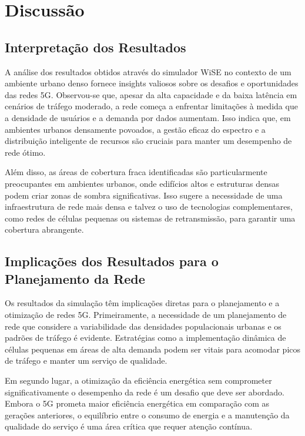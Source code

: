 \documentclass[journal]{IEEEtran}
\begin{document}
\section{Discussão}

\subsection{Interpretação dos Resultados}

A análise dos resultados obtidos através do simulador WiSE no contexto de um ambiente urbano denso fornece insights valiosos sobre os desafios e oportunidades das redes 5G. Observou-se que, apesar da alta capacidade e da baixa latência em cenários de tráfego moderado, a rede começa a enfrentar limitações à medida que a densidade de usuários e a demanda por dados aumentam. Isso indica que, em ambientes urbanos densamente povoados, a gestão eficaz do espectro e a distribuição inteligente de recursos são cruciais para manter um desempenho de rede ótimo.

Além disso, as áreas de cobertura fraca identificadas são particularmente preocupantes em ambientes urbanos, onde edifícios altos e estruturas densas podem criar zonas de sombra significativas. Isso sugere a necessidade de uma infraestrutura de rede mais densa e talvez o uso de tecnologias complementares, como redes de células pequenas ou sistemas de retransmissão, para garantir uma cobertura abrangente.

\subsection{Implicações dos Resultados para o Planejamento da Rede}

Os resultados da simulação têm implicações diretas para o planejamento e a otimização de redes 5G. Primeiramente, a necessidade de um planejamento de rede que considere a variabilidade das densidades populacionais urbanas e os padrões de tráfego é evidente. Estratégias como a implementação dinâmica de células pequenas em áreas de alta demanda podem ser vitais para acomodar picos de tráfego e manter um serviço de qualidade.

Em segundo lugar, a otimização da eficiência energética sem comprometer significativamente o desempenho da rede é um desafio que deve ser abordado. Embora o 5G prometa maior eficiência energética em comparação com as gerações anteriores, o equilíbrio entre o consumo de energia e a manutenção da qualidade do serviço é uma área crítica que requer atenção contínua.
\end{document}
